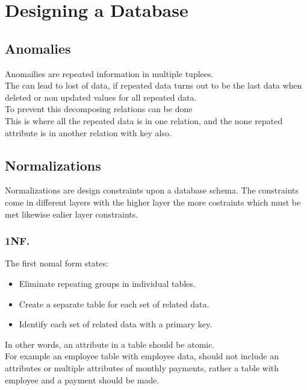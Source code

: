 \documentclass[12pt, a4paper]{article}
\begin{document}
	\section{Designing a Database}
		\subsection{Anomalies}
			Anomailies are repeated information in multiple tuplees.\\
			The can lead to lost of data, if repeated data turns out to be the last data when deleted or non updated values for all repeated data.\\
			To prevent this decomposing relations can be done\\
			This is where all the repeated data is in one relation, and the none repated attribute is in another relation with key also.\\
		\subsection{Normalizations}
			Normalizations are design constraints upon a database schema. The constraints come in different layers with the higher layer the more costraints which must be met likewise ealier layer constraints.
			\subsubsection{1NF.}
				The first nomal form states:
				\begin{itemize}
					\item Eliminate repeating groups in individual tables.
					\item Create a separate table for each set of related data.
					\item Identify each set of related data with a primary key.
				\end{itemize}
				In other words, an attribute in a table should be atomic.\\
				For example an employee table with employee data, should not include an attributes or multiple attributes of monthly payments, rather a table with employee and a payment should be made.
\end{document}
